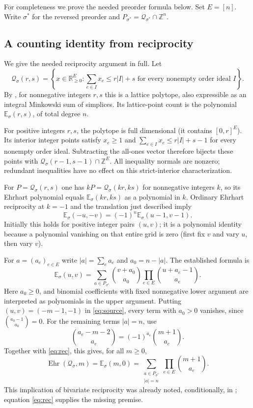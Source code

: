 \documentclass[11pt]{article}
\newcommand{\E}{\mathbb E}
\newcommand{\Q}{\mathcal Q}
\begin{document}
For completeness we prove the needed preorder formula below. Set $E=[n]$.
Write $\sigma^*$ for the reversed preorder and
$P_{\sigma^*}=\Q_{\sigma^*}\cap\mathbb Z^n$.

\subsection*{A counting identity from reciprocity}
We give the needed reciprocity argument in full. Let
\[
 \Q_\sigma(r,s)=\left\{x\in\mathbb R_{\ge0}^E:
       \sum_{e\in I}x_e\le r|I|+s
       \text{ for every nonempty order ideal }I\right\}.
\]
By \cite[Propositions 3.2--3.3 and 7.1]{AC}, for nonnegative
integers $r,s$ this is a lattice polytope, also expressible as an
integral Minkowski sum of simplices. Its lattice-point count is the
polynomial $\E_\sigma(r,s)$, of total degree $n$.

For positive integers $r,s$, the polytope is full dimensional
(it contains $[0,r]^E$). Its interior integer points satisfy
$x_e\ge1$ and $\sum_{e\in I}x_e\le r|I|+s-1$ for every
nonempty order ideal. Subtracting the all-ones vector therefore
bijects these points with $\Q_\sigma(r-1,s-1)\cap\mathbb Z^E$.
All inequality normals are nonzero; redundant inequalities have
no effect on this strict-interior characterization.

For $P=\Q_\sigma(r,s)$ one has $kP=\Q_\sigma(kr,ks)$ for
nonnegative integers $k$, so its Ehrhart polynomial equals
$\E_\sigma(kr,ks)$ as a polynomial in $k$. Ordinary Ehrhart
reciprocity at $k=-1$ and the translation just described imply
\begin{equation}\label{eq:rec}
 \E_\sigma(-u,-v)=(-1)^n\E_\sigma(u-1,v-1).
\end{equation}
Initially this holds for positive integer pairs $(u,v)$; it is a
polynomial identity because a polynomial vanishing on that entire
grid is zero (first fix $v$ and vary $u$, then vary $v$).

For $a=(a_e)_{e\in E}$ write $|a|=\sum_e a_e$ and $a_0=n-|a|$.
The established formula \cite[Lemma 4.1 and Equation (25)]{AC} is
\begin{equation}\label{eq:source}
 \E_\sigma(u,v)=\sum_{a\in P_{\sigma^*}}
       \binom{v+a_0}{a_0}\prod_{e\in E}\binom{u+a_e-1}{a_e}.
\end{equation}
Here $a_0\ge0$, and binomial coefficients with fixed nonnegative
lower argument are interpreted as polynomials in the upper argument.
Putting $(u,v)=(-m-1,-1)$ in \eqref{eq:source}, every term with
$a_0>0$ vanishes, since $\binom{a_0-1}{a_0}=0$.
For the remaining terms $|a|=n$, use
\[
 \binom{a_e-m-2}{a_e}=(-1)^{a_e}\binom{m+1}{a_e}.
\]
Together with \eqref{eq:rec}, this gives, for all $m\ge0$,
\begin{equation}\label{eq:count}
 \operatorname{Ehr}(\Q_\sigma,m)=\E_\sigma(m,0)
 =\sum_{\substack{a\in P_{\sigma^*}\\|a|=n}}
        \prod_{e\in E}\binom{m+1}{a_e}.
\end{equation}
This implication of bivariate reciprocity was already noted,
conditionally, in \cite[Remark 7.3]{AC}; equation \eqref{eq:rec}
supplies the missing premise.
\end{document}
